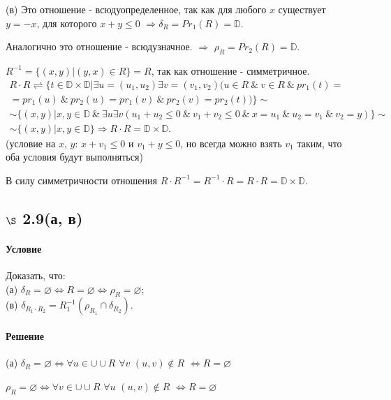\documentclass[a4paper,12pt]{article}
\begin{document}
\bigskip

(в) Это отношение - всюдуопределенное, так как для любого $x$ существует $y=-x$, для которого $x+y\leqslant 0$ $\Rightarrow \delta_R = Pr_1(R) = \mathbb{D}$.\par
Аналогично это отношение - всюдузначное. $\Rightarrow$ $\rho_R=Pr_2(R)=\mathbb{D}$.\par
$R^{-1} = \{(x,y)|(y,x)\in R\} = R$, так как отношение - симметричное.
\begin{gather*}
R\cdot R \rightleftharpoons \{t\in \mathbb{D}\times \mathbb{D} | \exists u=(u_1,u_2) \exists v=(v_1,v_2) (u\in R\  \& \ v\in R \ \& \ pr_1(t)=\\
= pr_1(u) \ \& \ pr_2(u)=pr_1(v) \ \& \ pr_2(v)=pr_2(t))\}\sim\\
\sim \{(x,y)|x,y\in \mathbb{D} \ \& \ \exists u \exists v (u_1+u_2\leqslant 0\ \& \ v_1+v_2\leqslant 0 \ \& \ x=u_1 \ \& \ u_2 = v_1 \ \& \ v_2 = y)\} \sim \\
\sim \{(x,y)|x,y\in \mathbb{D}\} \Rightarrow R\cdot R = \mathbb{D}\times \mathbb{D}.
\end{gather*}
(условие на $x$, $y$: $x+v_1\leqslant 0$ и $v_1+y\leqslant 0$, но всегда можно взять $v_1$ таким, что оба условия будут выполняться)\par
В силу симметричности отношения $R\cdot R^{-1} = R^{-1}\cdot R = R\cdot R = \mathbb{D}\times \mathbb{D}$.


\subsection*{$\S$ 2.9(а, в)}
\paragraph*{Условие}
Доказать, что:\\
(а) $\delta_R = \varnothing \Leftrightarrow R=\varnothing \Leftrightarrow \rho_R=\varnothing$;\\
(в) $\delta_{R_1\cdot R_2} = R_1^{-1} (\rho_{R_1} \cap \delta_{R_2})$.
\paragraph*{Решение}
(а) $\delta_R = \varnothing \Leftrightarrow \forall u \in  \cup \cup R$ $\forall v$ $(u,v)\notin R$ $\Leftrightarrow R=\varnothing$\par
$\rho_R = \varnothing \Leftrightarrow \forall v \in \cup \cup R$ $\forall u$ $(u,v)\notin R$ $\Leftrightarrow R=\varnothing$\par
\end{document}
